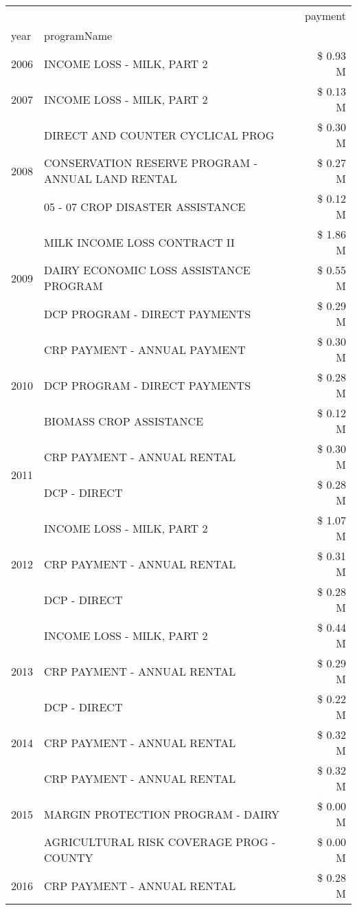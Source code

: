 \begin{tabular}{llr}
\toprule
 &  & payment \\
year & programName &  \\
\midrule
2006 & INCOME LOSS - MILK, PART 2 & \$ 0.93 M \\
\cline{1-3}
2007 & INCOME LOSS - MILK, PART 2 & \$ 0.13 M \\
\cline{1-3}
\multirow[t]{3}{*}{2008} & DIRECT AND COUNTER CYCLICAL PROG & \$ 0.30 M \\
 & CONSERVATION RESERVE PROGRAM - ANNUAL LAND RENTAL & \$ 0.27 M \\
 & 05 - 07 CROP DISASTER ASSISTANCE & \$ 0.12 M \\
\cline{1-3}
\multirow[t]{3}{*}{2009} & MILK INCOME LOSS CONTRACT II & \$ 1.86 M \\
 & DAIRY ECONOMIC LOSS ASSISTANCE PROGRAM & \$ 0.55 M \\
 & DCP PROGRAM - DIRECT PAYMENTS & \$ 0.29 M \\
\cline{1-3}
\multirow[t]{3}{*}{2010} & CRP PAYMENT - ANNUAL PAYMENT & \$ 0.30 M \\
 & DCP PROGRAM - DIRECT PAYMENTS & \$ 0.28 M \\
 & BIOMASS CROP ASSISTANCE & \$ 0.12 M \\
\cline{1-3}
\multirow[t]{2}{*}{2011} & CRP PAYMENT - ANNUAL RENTAL & \$ 0.30 M \\
 & DCP - DIRECT & \$ 0.28 M \\
\cline{1-3}
\multirow[t]{3}{*}{2012} & INCOME LOSS - MILK, PART 2 & \$ 1.07 M \\
 & CRP PAYMENT - ANNUAL RENTAL & \$ 0.31 M \\
 & DCP - DIRECT & \$ 0.28 M \\
\cline{1-3}
\multirow[t]{3}{*}{2013} & INCOME LOSS - MILK, PART 2 & \$ 0.44 M \\
 & CRP PAYMENT - ANNUAL RENTAL & \$ 0.29 M \\
 & DCP - DIRECT & \$ 0.22 M \\
\cline{1-3}
2014 & CRP PAYMENT - ANNUAL RENTAL & \$ 0.32 M \\
\cline{1-3}
\multirow[t]{3}{*}{2015} & CRP PAYMENT - ANNUAL RENTAL & \$ 0.32 M \\
 & MARGIN PROTECTION PROGRAM - DAIRY & \$ 0.00 M \\
 & AGRICULTURAL RISK COVERAGE PROG - COUNTY & \$ 0.00 M \\
\cline{1-3}
\multirow[t]{3}{*}{2016} & CRP PAYMENT - ANNUAL RENTAL & \$ 0.28 M \\

\end{tabular}
